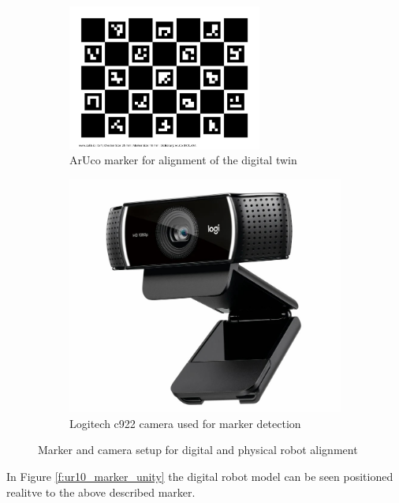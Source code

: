 \begin{figure}[h]
    \centering
    \begin{subfigure}[b]{0.45\textwidth}
    \centering
    \includegraphics[width=0.7\textwidth]{figs/calib_io_charuco_200x150_5x7_25_18_DICT_4X4.png}
    \caption{ArUco marker for alignment of the digital twin}
    \label{f:aruco_marker}
    \end{subfigure}
        \hfill
    \begin{subfigure}[b]{0.45\textwidth}
        \centering
        \includegraphics[width=0.7\linewidth]{figs/camera-c922.jpg}
        \caption{Logitech c922 camera used for marker detection}
        \label{fig:camera-c922}
    \end{subfigure}
    \caption{Marker and camera setup for digital and physical robot alignment}
\label{marker-camera}
\end{figure}

In Figure \ref{f:ur10_marker_unity} the digital robot model can be seen positioned realitve to the above described marker.

